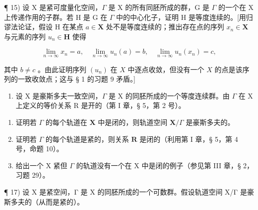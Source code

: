 ¶ 15) 设 X 是紧可度量化空间，\(\Gamma\) 是 X 的所有同胚所成的群，G 是 \(\Gamma\) 的一个在 X 上传递作用的子群。若 H 是 G 在 \(\Gamma\) 中的中心化子，证明 H 是等度连续的。{[}用归谬法论证，假设 H 在某点 \(a \in \mathbf{X}\) 处不是等度连续的；推出存在点的序列 \(x_n \in \mathbf{X}\) 与元素的序列 \(u_n \in \mathbf{H}\) 使得

\[
\lim _ {n \rightarrow \infty} x _ {n} = a, \quad \lim _ {n \rightarrow \infty} u _ {n} (a) = b, \quad \lim _ {n \rightarrow \infty} u _ {n} (x _ {n}) = c,
\]

其中 \(b \neq c\) 。由此证明序列 \((u_n)\) 在 \(X\) 中逐点收敛，但没有一个 \(X\) 的点是该序列的一致收敛点；这与 § 1 的习题 9 矛盾。{]}

\begin{enumerate}
\def\labelenumi{\arabic{enumi})}
\setcounter{enumi}{15}
\tightlist
\item
  设 X 是豪斯多夫一致空间，\(\Gamma\) 是 X 的同胚所成的一个等度连续群。由 \(\Gamma\) 在 X 上定义的等价关系 R 是开的（第 I 章，§ 5，第 2 号）。
\end{enumerate}

\begin{enumerate}
\def\labelenumi{\alph{enumi})}
\item
  证明若 \(\Gamma\) 的每个轨道在 \(\mathbf{X}\) 中是闭的，则轨道空间 \(\mathbf{X} / \Gamma\) 是豪斯多夫的。
\item
  证明若 \(\Gamma\) 的每个轨道是紧的，则关系 \(\mathbf{R}\) 是闭的（利用第 I 章，§ 5，第 4 号，命题 10）。
\item
  给出一个 X 紧但 \(\Gamma\) 的轨道没有一个在 X 中是闭的例子（参见第 III 章，§ 2，习题 29）。
\end{enumerate}

¶ 17) 设 X 是紧空间，Γ 是 X 的同胚所成的一个可数群。假设轨道空间 X/Γ 是豪斯多夫的（从而是紧的）。


